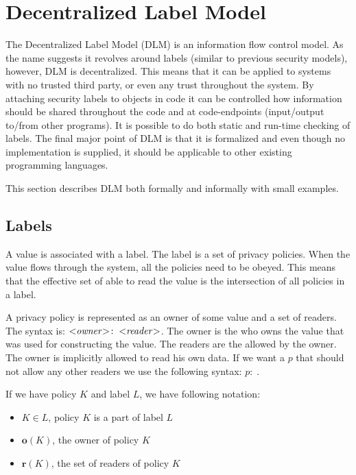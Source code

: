 
\newcommand{\policy}[2]{\ensuremath{#1\!:\;#2}}

\section{Decentralized Label Model}
The Decentralized Label Model (DLM) is an information flow control model.
As the name suggests it revolves around labels (similar to previous security models), however, DLM is decentralized.
This means that it can be applied to systems with no trusted third party, or even any trust throughout the system.
By attaching security labels to objects in code it can be controlled how information should be shared throughout the code and at code-endpoints (input/output to/from other programs).
It is possible to do both static and run-time checking of labels.
The final major point of DLM is that it is formalized and even though no implementation is supplied, it should be applicable to other existing programming languages.

\newcommand{\xvalue}{value}
\newcommand{\xvalues}{values}
This section describes DLM both formally and informally with small examples.

\subsection{Labels}
A \xvalue{} is associated with a label.
The label is a set of privacy policies.
When the \xvalue{} flows through the system, all the policies need to be obeyed.
This means that the effective set of \principals{} able to read the \xvalue{} is the intersection of all policies in a label.

A privacy policy is represented as an owner of some \xvalue{} and a set of readers.
The syntax is: $\policy{\text{<\emph{owner}>}}{\text{<\emph{reader}>}}$.
The owner is the \principal{} who owns the \xvalue{} that was used for constructing the \xvalue{}.
The readers are the \principals{} allowed by the owner.
The owner is implicitly allowed to read his own data.
If we want a \principal{} $p$ that should not allow any other readers we use the following syntax: $\policy{p}{}$.

If we have policy $K$ and label $L$, we have following notation:
\begin{itemize}
\item $K \in L$, policy $K$ is a part of label $L$
\item $\textbf{o}(K)$, the owner of policy $K$
\item $\textbf{r}(K)$, the set of readers of policy $K$
\end{itemize}

